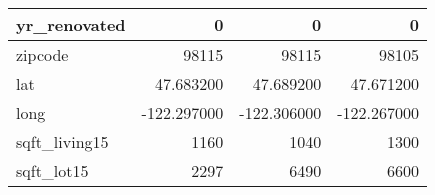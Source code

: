 \begin{table}[H]
\begin{tabular}{|l|r|r|r|}
\hline yr\_renovated & \cellcolor[rgb]{0.9, 0.54, 0.52} 0 & \cellcolor[rgb]{0.9, 0.54, 0.52} 0 & \cellcolor[rgb]{0.9, 0.54, 0.52} 0 \\
\hline zipcode & \cellcolor[rgb]{0.9, 0.54, 0.52} 98115 & \cellcolor[rgb]{0.9, 0.54, 0.52} 98115 & 98105 \\
\hline lat & \cellcolor[rgb]{0.9, 0.54, 0.52} 47.683200 & 47.689200 & 47.671200 \\
\hline long & \cellcolor[rgb]{0.9, 0.54, 0.52} -122.297000 & \cellcolor[rgb]{0.9, 0.54, 0.52} -122.306000 & \cellcolor[rgb]{0.9, 0.54, 0.52} -122.267000 \\
\hline sqft\_living15 & \cellcolor[rgb]{0.9, 0.54, 0.52} 1160 & 1040 & 1300 \\
\hline sqft\_lot15 & \cellcolor[rgb]{0.9, 0.54, 0.52} 2297 & 6490 & 6600 \\
\hline
\end{tabular}
\end{table}
